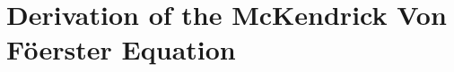 \documentclass[../main.tex]{subfiles}
\begin{document}
  \chapter{Derivation of the McKendrick Von Föerster Equation}\label{chapter:derivation}
\end{document}
